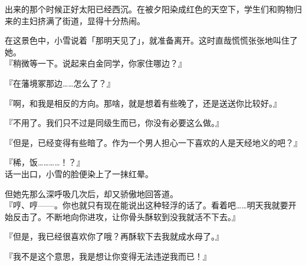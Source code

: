 出来的那个时候正好太阳已经西沉。在被夕阳染成红色的天空下，学生们和购物归来的主妇挤满了街道，显得十分热闹。

在这景色中，小雪说着「那明天见了」，就准备离开。这时直哉慌慌张张地叫住了她。\\

『稍微等一下。说起来白金同学，你家住哪边？』

『在藩境冢那边……怎么了？』

『啊，和我是相反的方向。那啥，就是想着有些晚了，还是送送你比较好。』

『不用了。我们只不过是同级生而已，你没有必要这么做。』

『但是，已经变得有些暗了。作为一个男人担心一下喜欢的人是天经地义的吧？』

『稀，饭…………！？』\\

话一出口，小雪的脸便染上了一抹红晕。

但她先那么深呼吸几次后，却又骄傲地回答道。\\

『哼、哼——。你也就只有现在能说出这种轻浮的话了。看着吧……明天我就要开始反击了。不断地向你进攻，让你骨头酥软到没我就活不下去。』

『但是，我已经很喜欢你了哦？再酥软下去我就成水母了。』

『我不是这个意思，我是想让你变得无法违逆我而已！』\\

